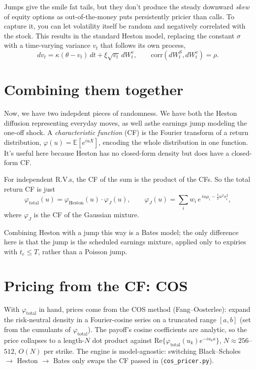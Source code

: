 \documentclass[11pt]{article}
\newcommand{\E}{\mathbb E}
\begin{document}
Jumps give the smile fat tails, but they don't produce the steady downward
\emph{skew} of equity options as out-of-the-money puts persistently pricier than
calls. To capture it, you can let volatility itself be random and
negatively correlated with the stock. This results in the standard Heston model, replacing the constant
$\sigma$ with a time-varying
variance $v_t$ that follows its own process,
\begin{equation}
dv_t = \kappa(\theta - v_t)\,dt + \xi\sqrt{v_t}\,dW_t^{v},
\qquad \mathrm{corr}(dW_t^S, dW_t^v)=\rho.
\end{equation}

\section{Combining them together}

Now, we have two indepdent pieces of randomness. We have both the Heston diffusion representing everyday moves,
as well asthe earnings jump modeling the one-off shock. 
A \emph{characteristic function}
(CF) is the Fourier transform of a return distribution, $\varphi(u)=\E[e^{iu X}]$, 
encoding the whole distribution in one function. It's useful here because Heston
has no closed-form density but does have a closed-form CF.

For independent R.V.s, the CF of the sum is the product of the CFs. So
the total return CF is just
\begin{equation}
\varphi_{\text{total}}(u)=\varphi_{\text{Heston}}(u)\cdot\varphi_{J}(u),
\qquad
\varphi_{J}(u)=\sum_{i} w_i\,e^{\,iu\mu_i-\frac12 u^2 s_i^2},
\end{equation}
where $\varphi_J$ is the CF of the Gaussian mixture. 

Combining Heston with a jump this way is a Bates model; the only difference here is
that the jump is the scheduled earnings mixture, applied only to expiries with
$t_e\le T$, rather than a Poisson jump.

\section{Pricing from the CF: COS}

With $\varphi_{\text{total}}$ in hand, prices come from the COS method
(Fang--Oosterlee): expand the risk-neutral density in a Fourier-cosine series on a
truncated range $[a,b]$ (set from the cumulants of $\varphi_{\text{total}}$). The
payoff's cosine coefficients are analytic, so the price collapses to a length-$N$
dot product against $\mathrm{Re}\{\varphi_{\text{total}}(u_k)e^{-iu_k a}\}$,
$N\approx 256$--$512$, $O(N)$ per strike. The engine is model-agnostic: switching
Black--Scholes $\to$ Heston $\to$ Bates only swaps the CF passed in
(\texttt{cos\_pricer.py}).
\end{document}
